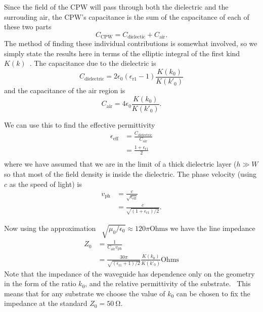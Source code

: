 Since the field of the CPW will pass through both the dielectric and the
surrouding air, the CPW's capacitance is the sum of the capacitance of each of
these two parts
%
\begin{equation}
  C_\text{CPW} = C_\text{dielectic} + C_\text{air}.
\end{equation}
%
The method of finding these individual contributions is somewhat involved, so
we simply state the results here in terms of the elliptic integral of the
first kind $K(k)$~\cite{Simons2004}. The capacitance due to the dielectric is
%
%
\begin{equation}
  C_\text{dielectric} = 2\epsilon_0(\epsilon_\text{r1}-1)\frac{K(k_0)}{K(k'_0)}
\end{equation}
%
and the capacitance of the air region is
%
\begin{equation}
  C_\text{air} = 4\epsilon_0 \frac{K(k_0)}{K(k'_0)}.
\end{equation}

We can use this to find the effective permittivity~\cite{Simons2004}
%
\begin{align}
  \epsilon_\text{eff} &= \frac{C_\text{dielectric}}{C_\text{air}} \\
    &= \frac{1+ \epsilon_\text{r1}}{2} \\
\end{align}
%
where we have assumed that we are in the limit of a thick dielectric layer ($h
\gg W$ so that most of the field density is inside the dielectric.
%
The phase velocity (using $c$ as the speed of light) is~\cite{Simons2004}
%
\begin{align}
  v_\text{ph} &= \frac{c}{\sqrt{\epsilon_\text{eff}}} \\
    &= \frac{c}{\sqrt{(1 + \epsilon_\text{r1})/2}}.
\end{align}

Now using the approximation~\cite{Collin2007}
$\sqrt{\mu_0/\epsilon_0}\approx120\pi\text{Ohms}$ we have the line
impedance~\cite{Simons2004}
\begin{align}
  Z_0 &= \frac{1}{C_\text{air} v_\text{ph}} \\
    &= \frac{30 \pi}{\sqrt{(\epsilon_\text{r1}+1)/2}} \frac{K(k_0)}{K(k'_0)}
    \text{Ohms}
    \label{mws:eqn:Z0}
\end{align}
Note that the impedance of the waveguide has dependence only on the geometry in
the form of the ratio $k_0$, and the relative permittivity of the
substrate.~\cite{Simons2004} This means that for any substrate we choose the
value of $k_0$ can be chosen to fix the impedance at the standard $Z_0 =
\SI{50}{\ohm}$.

